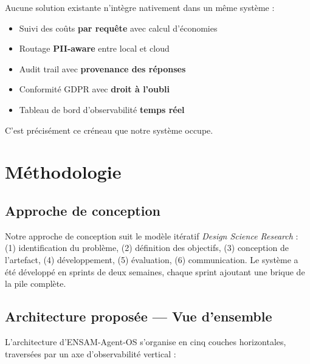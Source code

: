 \documentclass[12pt, a4paper]{article}
\begin{document}
\begin{notebox}
Aucune solution existante n'intègre nativement dans un même système :
\begin{itemize}
  \item Suivi des coûts \textbf{par requête} avec calcul d'économies
  \item Routage \textbf{PII-aware} entre local et cloud
  \item Audit trail avec \textbf{provenance des réponses}
  \item Conformité GDPR avec \textbf{droit à l'oubli}
  \item Tableau de bord d'observabilité \textbf{temps réel}
\end{itemize}
C'est précisément ce créneau que notre système occupe.
\end{notebox}


\section{Méthodologie}
\label{chap:methodologie}

\subsection{Approche de conception}

Notre approche de conception suit le modèle itératif \textit{Design Science Research} : (1) identification du problème, (2) définition des objectifs, (3) conception de l'artefact, (4) développement, (5) évaluation, (6) communication. Le système a été développé en sprints de deux semaines, chaque sprint ajoutant une brique de la pile complète.

\subsection{Architecture proposée — Vue d'ensemble}

L'architecture d'ENSAM-Agent-OS s'organise en cinq couches horizontales, traversées par un axe d'observabilité vertical :
\end{document}
